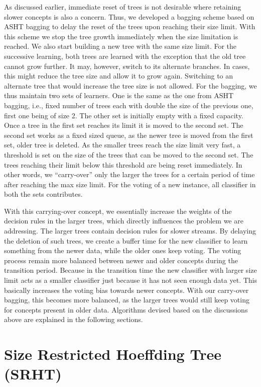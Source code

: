 As discussed earlier,  immediate reset of trees is not desirable where retaining  slower concepts is also a concern. Thus, we developed a bagging scheme based on ASHT bagging to delay the reset of the trees upon reaching their size limit. With this scheme we stop the tree growth immediately when the size limitation is reached. We also start building a new tree with the same size limit. For the successive learning, both trees are learned with the exception that the old tree cannot grow further. It may, however, switch to its alternate branches. In cases, this might reduce the tree size and allow it to grow again. Switching to an alternate tree that would increase the tree size is not allowed. For the bagging, we thus maintain two sets of learners. One is the same as the one from ASHT bagging, i.e., fixed number of trees each with double the size of the previous one, first one being of size 2. The other set is initially empty with a fixed capacity. Once a tree in the first set reaches its limit it is moved to the second set. The second set works as a fixed sized queue, as the newer tree is moved from the first set, older tree is deleted. As the smaller trees reach the size limit very fast, a threshold is set on the size of the trees that can be moved to the second set. The trees reaching their limit below this threshold are being reset immediately. In other words, we ``carry-over'' only the larger the trees for a certain period of time after reaching the max size limit. For the voting of a new instance, all classifier in both the sets contributes.

With this carrying-over concept, we essentially increase the weights of the decision rules in the larger trees, which directly influences the problem we are addressing. The larger trees contain decision rules for slower streams. By delaying the deletion of such trees, we create a buffer time for the new classifier to learn something from the newer data, while the older ones keep voting. The voting process remain more balanced between newer and older concepts during the transition period. Because in the transition time the new classifier with larger size limit acts as a smaller classifier just because it has not seen enough data yet. This basically increases the voting bias towards newer concepts. With our  carry-over bagging, this becomes more balanced, as the larger trees would still keep voting for concepts present in older data. Algorithms devised based on the discussions above are explained in the following sections.

\section{Size Restricted Hoeffding Tree (SRHT)}

